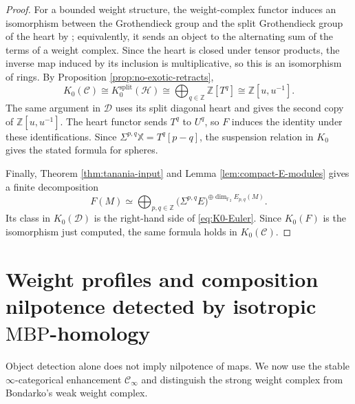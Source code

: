 \documentclass[11pt]{amsart}
\numberwithin{equation}{section}
\theoremstyle{definition}
\theoremstyle{remark}
\newcommand{\MBP}{\mathrm{MBP}}
\newcommand{\F}{\mathbb F_2}
\newcommand{\X}{\mathbb X}
\newcommand{\Cinf}{\mathcal C_{\infty}}
\newcommand{\C}{\mathcal C}
\newcommand{\D}{\mathcal D}
\newcommand{\Hh}{\mathcal H}
\begin{document}
\begin{proof}
For a bounded weight structure, the weight-complex functor induces an
isomorphism between the Grothendieck group and the split Grothendieck group
of the heart by \cite[Proposition~4.2]{Sosnilo}; equivalently, it sends an
object to the alternating sum of the terms of a weight complex.  Since the
heart is closed under tensor products, the inverse map induced by its
inclusion is multiplicative, so this is an isomorphism of rings.  By Proposition 
\ref{prop:no-exotic-retracts},
\[
  K_0(\C)\cong K_0^{\mathrm{split}}(\Hh)
  \cong\bigoplus_{q\in\mathbb Z}\mathbb Z[T^q]
  \cong\mathbb Z[u,u^{-1}].
\]
The same argument in $\D$ uses its split diagonal heart and gives the second
copy of $\mathbb Z[u,u^{-1}]$.  The heart functor sends $T^q$ to $U^q$, so
$F$ induces the identity under these identifications.  Since
$\Sigma^{p,q}\X=T^q[p-q]$, the suspension relation in $K_0$ gives the stated
formula for spheres.

Finally, Theorem \ref{thm:tanania-input} and Lemma \ref{lem:compact-E-modules} gives a finite
decomposition
\[
  F(M)\simeq
  \bigoplus_{p,q\in\mathbb Z}
  \bigl(\Sigma^{p,q}E\bigr)^{\oplus\dim_{\F}E_{p,q}(M)}.
\]
Its class in $K_0(\D)$ is the right-hand side of
\eqref{eq:K0-Euler}.  Since $K_0(F)$ is the isomorphism just computed, the
same formula holds in $K_0(\C)$.
\end{proof}

\section{Weight profiles and composition nilpotence detected by isotropic
\texorpdfstring{$\MBP$}{MBP}-homology}
\label{sec:nilpotence}

Object detection alone does not imply nilpotence of maps.  We now use the
stable $\infty$-categorical enhancement $\Cinf$ and distinguish the strong
weight complex from Bondarko's weak weight complex.
\end{document}
